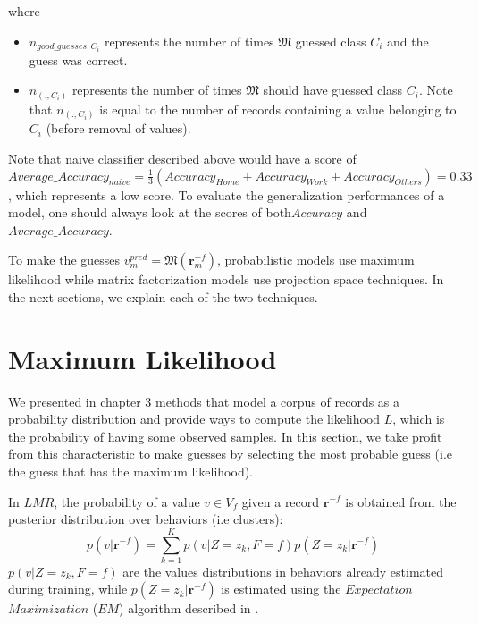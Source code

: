 where 
\begin{itemize} 
	\item $n_{good\_guesses,C_{i}}$  represents the number of times $\mathfrak{M}$ guessed class $C_{i}$ and the guess was correct.
	\item $n_{(.,C_{i})}$ represents the number of times $\mathfrak{M}$ should have guessed class $C_{i}$. Note that $n_{(.,C_{i})}$ is equal to the number of records containing a value belonging to $C_{i}$ (before removal of 				values).
\end{itemize}
Note that naive classifier described above would have a score of $Average\_Accuracy_{naive}=\frac{1}{3}(Accuracy_{Home}+Accuracy_{Work}+Accuracy_{Others})=0.33$, which represents a low score. To evaluate the generalization performances of a model, one should always look at the scores of both$Accuracy$ and $Average\_Accuracy$.\par

To make the guesses $v_{m}^{pred}=\mathfrak{M}(\mathbf{r}_{m}^{-f})$, probabilistic models use maximum likelihood while matrix factorization models use projection space techniques. In the next sections, we explain each of the two techniques. 
\section{Maximum Likelihood}

We presented in chapter 3 methods that model a corpus of records as a probability distribution and provide ways to compute the likelihood $\mathit{L}$, which is the probability of having some observed samples. In this section, we take profit from this characteristic to make guesses by selecting the most probable guess (i.e the guess that has the maximum likelihood). \par

In $LMR$, the probability of a value $v \in V_{f}$ given a record $\mathbf{r}^{-f}$ is obtained from the posterior distribution over behaviors (i.e clusters):
\begin{equation}
p(v|\mathbf{r}^{-f})=\sum_{k=1}^{K}p(v|Z=z_{k}, F=f)p(Z=z_{k}|\mathbf{r}^{-f})
\end{equation}
$p(v|Z=z_{k}, F=f)$ are the values distributions in behaviors already estimated during training, while $p(Z=z_{k}|\mathbf{r}^{-f})$ is estimated using the $Expectation$ $Maximization$ ($EM$) algorithm described in \cite{plsi}. \par

